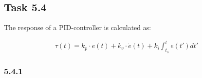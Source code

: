 \subsection*{Task 5.4}

The response of a PID-controller is calculated as:

\begin{align*}
	\tau(t) = k_p \cdot e(t) + k_v \cdot \dot{e}(t) + k_i \int_{t_o}^{t}e(t')dt'
\end{align*}

\subsubsection{5.4.1}

